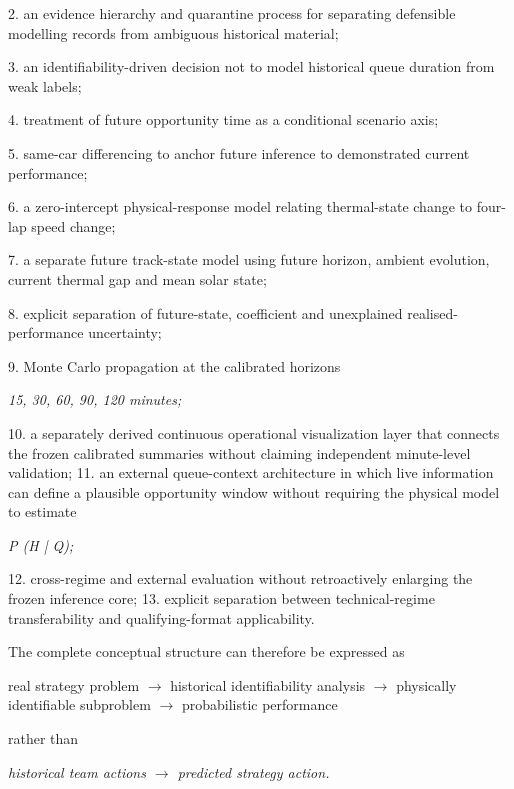 2. an evidence hierarchy and quarantine process for separating defensible modelling records from ambiguous historical material;

3. an identifiability-driven decision not to model historical queue duration from weak labels;

4. treatment of future opportunity time as a conditional scenario axis;

5. same-car differencing to anchor future inference to demonstrated current performance;

6. a zero-intercept physical-response model relating thermal-state change to four-lap speed change;

7. a separate future track-state model using future horizon, ambient evolution, current thermal gap and mean solar state;

8. explicit separation of future-state, coefficient and unexplained realised-performance uncertainty;

9. Monte Carlo propagation at the calibrated horizons

\begin{center}\textit{15, 30, 60, 90, 120 minutes;}\end{center}

10. a separately derived continuous operational visualization layer that connects the frozen calibrated summaries without claiming independent minute-level validation; 11. an external queue-context architecture in which live information can define a plausible opportunity window without requiring the physical model to estimate

\begin{center}\textit{P (H | Q);}\end{center}

12. cross-regime and external evaluation without retroactively enlarging the frozen inference core; 13. explicit separation between technical-regime transferability and qualifying-format applicability.

The complete conceptual structure can therefore be expressed as

real strategy problem \ensuremath{\rightarrow} historical identifiability analysis \ensuremath{\rightarrow} physically identifiable subproblem \ensuremath{\rightarrow} probabilistic performance

rather than

\begin{center}\textit{historical team actions \ensuremath{\rightarrow} predicted strategy action.}\end{center}


